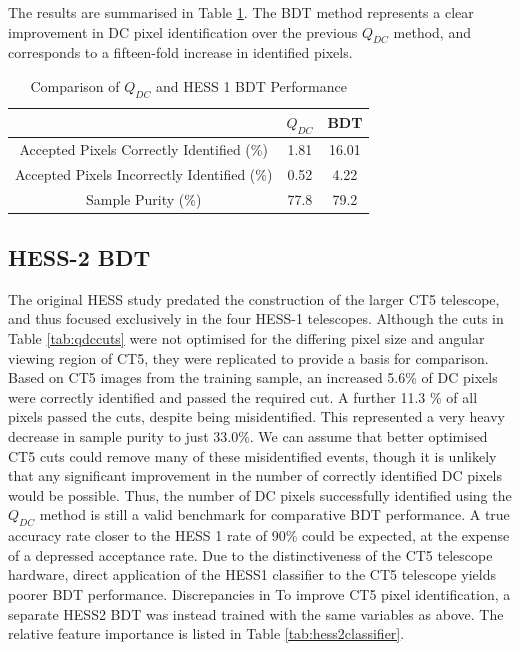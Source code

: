 \documentclass[11pt]{article}
\begin{document}
The results are summarised in Table \ref{tab:qdcbdtcomparison1}. The BDT method represents a clear improvement in DC pixel identification over the previous $Q_{DC}$ method, and corresponds to a fifteen-fold increase in identified pixels. 

\begin{table}[h!]
  \centering
  \caption{Comparison of $Q_{DC}$ and HESS 1 BDT Performance}
  \label{tab:qdcbdtcomparison1}
  \begin{tabular}{ccc}
    \toprule
    & $Q_{DC}$ & BDT\\
    \midrule
    Accepted Pixels Correctly Identified (\%)  & 1.81 & 16.01\\
   Accepted Pixels Incorrectly Identified (\%)  & 0.52& 4.22\\
    Sample Purity (\%)  & 77.8 & 79.2 \\
    \bottomrule
  \end{tabular}
\end{table}

\subsection{HESS-2 BDT}
The original HESS study predated the construction of the larger CT5 telescope, and thus focused exclusively in the four HESS-1 telescopes. Although the cuts in Table \ref{tab:qdccuts} were not optimised for the differing pixel size and angular viewing region of CT5, they were replicated to provide a basis for comparison. Based on CT5 images from the training sample, an increased 5.6\% of DC pixels were correctly identified and passed the required cut. A further 11.3 \% of all pixels passed the cuts, despite being misidentified. This represented a very heavy decrease in sample purity to just 33.0\%. We can assume that better optimised CT5 cuts could remove many of these misidentified events, though it is unlikely that any significant improvement in the number of correctly identified DC pixels would be possible. Thus, the number of DC pixels successfully identified using the $Q_{DC}$ method is still a valid benchmark for comparative BDT performance. A true accuracy rate closer to the HESS 1 rate of 90\% could be expected, at the expense of a depressed acceptance rate. Due to the distinctiveness of the CT5 telescope hardware, direct application of the HESS1 classifier to the CT5 telescope yields poorer BDT performance. Discrepancies in To improve CT5 pixel identification, a separate HESS2 BDT was instead trained with the same variables as above. The relative feature importance is listed in Table \ref{tab:hess2classifier}. 
\end{document}
